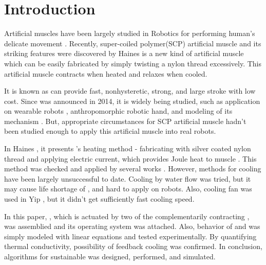 
\section{Introduction}
Artificial muscles have been largely studied in Robotics for performing human's delicate movement \cite{ashley}. Recently, super-coiled polymer(SCP) artificial muscle and its striking features were discovered by Haines \etal \cite{haines} \scp is a new kind of artificial muscle which can be easily fabricated by simply twisting a nylon thread excessively. This artificial muscle contracts when heated and relaxes when cooled.

It is known as \scp can provide fast, nonhysteretic, strong, and large stroke with low cost\cite{yuan, mirvakili, madden}. 
Since \scp was announced in 2014, it is widely being studied, such as application on
wearable robots \cite{sphincter, kianzad2}, 
anthropomorphic robotic hand\cite{yip, finger}, 
and modeling of its mechanism \cite{treatise, torsional, youngmodulus, fab_coil, multiscale, healing, kianzad, moretti}. 
But, appropriate circumstances for SCP artificial muscle%
hadn't been studied enough to apply this artificial muscle into real robots.

In Haines \etal, it presents \scp 's heating method - fabricating \scp with silver coated nylon thread and applying electric current, which provides Joule heat to muscle \cite{haines}. This method was checked and applied by several works \cite{yip, mirvakili,kianzad,sphincter,kianzad2}. However, methods for cooling \scp have been largely unsuccessful to date. 
Cooling by water flow was tried\cite{haines,finger}, but it may cause life shortage of \scp \cite{haines}, and hard to apply on robots. Also, cooling fan was used in Yip \etal, but it didn't get sufficiently fast cooling speed.

In this paper, \antanospace, which is actuated by two of the complementarily contracting \scpnospace, was assemblied and its operating system was attached. Also, behavior of \scp and \anta was simply modeled with linear equations and tested experimentally. By quantifying thermal conductivity, possibility of feedback cooling was confirmed. In conclusion, algorithms for sustainable \apc was designed, performed, and simulated.